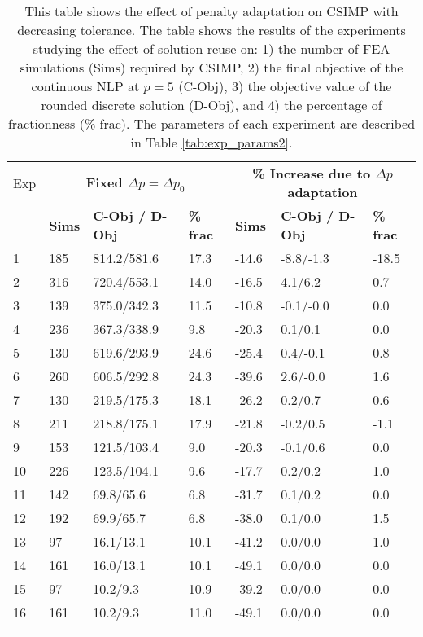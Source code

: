 \begin{table}
\centering
\tabcolsep=0.09cm
\caption{This table shows the effect of penalty adaptation on CSIMP with decreasing tolerance. The table shows the results of the experiments studying the effect of solution reuse on: 1) the number of FEA simulations (Sims) required by CSIMP, 2) the final objective of the continuous NLP at $p = 5$ (C-Obj), 3) the objective value of the rounded discrete solution (D-Obj), and 4) the percentage of fractionness (\% frac). The parameters of each experiment are described in Table \ref{tab:exp_params2}.}
\label{tab:dec_tol_csimp_reuse}
\begin{tabular}{|l|l|l|l|l||l|l|}
\hline\noalign{\smallskip}
Exp & \multicolumn{3}{c||}{\textbf{Fixed $\Delta p = \Delta p_0$}} & \multicolumn{3}{c|}{\textbf{\% Increase due to $\Delta p$ adaptation}} \\
\noalign{\smallskip}\hline\noalign{\smallskip}
& \textbf{Sims} & \textbf{C-Obj / D-Obj} & \textbf{\% frac} & \textbf{Sims} & \textbf{C-Obj / D-Obj} & \textbf{\% frac}\\
\hline
1 & 185 & 814.2/581.6 & 17.3 & -14.6 & -8.8/-1.3 & -18.5 \\ 
\hline
2 &  316 & 720.4/553.1 & 14.0 & -16.5 & 4.1/6.2 & 0.7 \\ 
\hline
3 &  139 & 375.0/342.3 & 11.5 & -10.8 & -0.1/-0.0 & 0.0 \\ 
\hline
4 &  236 & 367.3/338.9 & 9.8 & -20.3 & 0.1/0.1 & 0.0 \\ 
\hline
\hline
5 & 130 & 619.6/293.9 & 24.6 & -25.4 & 0.4/-0.1 & 0.8 \\ 
\hline
6 & 260 & 606.5/292.8 & 24.3 & -39.6 & 2.6/-0.0 & 1.6 \\ 
\hline
7 & 130 & 219.5/175.3 & 18.1 & -26.2 & 0.2/0.7 & 0.6 \\ 
\hline
8 & 211 & 218.8/175.1 & 17.9 & -21.8 & -0.2/0.5 & -1.1 \\ 
\hline
\hline
9 & 153 & 121.5/103.4 & 9.0 & -20.3 & -0.1/0.6 & 0.0 \\ 
\hline
10 & 226 & 123.5/104.1 & 9.6 & -17.7 & 0.2/0.2 & 1.0 \\ 
\hline
11 & 142 & 69.8/65.6 & 6.8 & -31.7 & 0.1/0.2 & 0.0 \\ 
\hline
12 & 192 & 69.9/65.7 & 6.8 & -38.0 & 0.1/0.0 & 1.5 \\ 
\hline
\hline
13 & 97 & 16.1/13.1 & 10.1 & -41.2 & 0.0/0.0 & 1.0 \\ 
\hline
14 & 161 & 16.0/13.1 & 10.1 & -49.1 & 0.0/0.0 & 0.0 \\ 
\hline
15 & 97 & 10.2/9.3 & 10.9 & -39.2 & 0.0/0.0 & 0.0 \\ 
\hline
16 & 161 & 10.2/9.3 & 11.0 & -49.1 & 0.0/0.0 & 0.0 \\ 
\hline
\noalign{\smallskip}\hline
\end{tabular}
\end{table}
